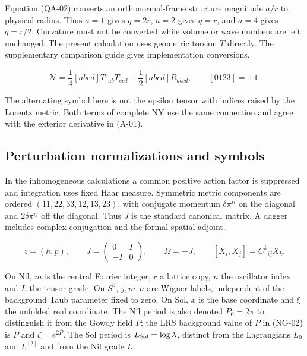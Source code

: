 Equation (QA-02) converts an orthonormal-frame structure magnitude $a/r$ to physical radius. Thus $a=1$ gives $q=2r$, $a=2$ gives $q=r$, and $a=4$ gives $q=r/2$. Curvature must not be converted while volume or wave numbers are left unchanged. The present calculation uses geometric torsion $T$ directly. The supplementary comparison guide gives implementation conversions.

\begin{equation}\tag{QA-03}\label{eq:QA-03}
\mathcal N=\frac14[abcd]T^e{}_{ab}T_{ecd}-\frac12[abcd]R_{abcd},\qquad[0123]=+1.
\end{equation}

The alternating symbol here is not the epsilon tensor with indices raised by the Lorentz metric. Both terms of complete NY use the same connection and agree with the exterior derivative in (A-01).


\subsection{Perturbation normalizations and symbols}

In the inhomogeneous calculations a common positive action factor is suppressed and integration uses fixed Haar measure. Symmetric metric components are ordered $(11,22,33,12,13,23)$, with conjugate momentum $\delta\pi^{ii}$ on the diagonal and $2\delta\pi^{ij}$ off the diagonal. Thus $J$ is the standard canonical matrix. A dagger includes complex conjugation and the formal spatial adjoint.

\begin{equation}\tag{QA-04}\label{eq:QA-04}
z=(h,p),\qquad J=\begin{pmatrix}0&I\\-I&0\end{pmatrix},\qquad
\Omega=-J,\qquad [X_i,X_j]=C^k{}_{ij}X_k.
\end{equation}

On Nil, $m$ is the central Fourier integer, $r$ a lattice copy, $n$ the oscillator index and $L$ the tensor grade. On $S^3$, $j,m,n$ are Wigner labels, independent of the background Taub parameter fixed to zero. On Sol, $x$ is the base coordinate and $\xi$ the unfolded real coordinate. The Nil period is also denoted $P_0=2\pi$ to distinguish it from the Gowdy field $P$; the LRS background value of $P$ in (NG-02) is $\bar P$ and $\zeta=e^{2\bar P}$. The Sol period is $L_{\rm Sol}=\log\lambda$, distinct from the Lagrangians $L_0$ and $L^{[2]}$ and from the Nil grade $L$.
